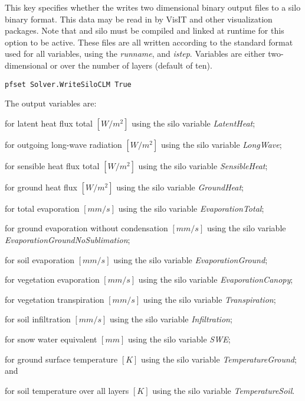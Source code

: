 {This key specifies whether the  writes two dimensional binary output files to a silo binary format. This data may be read in by VisIT and other visualization packages.  Note that  and silo must be compiled and linked at runtime for this option to be active. These files are all written according to the standard format used for all \parflow{} variables, using the {\em runname}, and {\em istep}.  Variables are either two-dimensional or over the number of  layers (default of ten).
}
\begin{display}\begin{verbatim}
pfset Solver.WriteSiloCLM True
\end{verbatim}\end{display}
The output variables are:
\begin{description}
\item {} for latent heat flux total $[W/m^2]$ using the silo variable {\em LatentHeat};
\item {} for outgoing long-wave radiation $[W/m^2]$ using the silo variable {\em LongWave};
\item {} for sensible heat flux total $[W/m^2]$ using the silo variable {\em SensibleHeat};
\item {} for ground heat flux $[W/m^2]$ using the silo variable {\em GroundHeat};
\item {} for total evaporation $[mm/s]$ using the silo variable {\em EvaporationTotal};
\item {} for ground evaporation without condensation $[mm/s]$ using the silo variable {\em EvaporationGroundNoSublimation};
\item {} for soil evaporation $[mm/s]$ using the silo variable {\em EvaporationGround};
\item {} for vegetation evaporation $[mm/s]$ using the silo variable {\em EvaporationCanopy};
\item {} for vegetation transpiration $[mm/s]$ using the silo variable {\em Transpiration};
\item {} for soil infiltration $[mm/s]$ using the silo variable {\em Infiltration};
\item {} for snow water equivalent $[mm]$ using the silo variable {\em SWE};
\item {} for ground surface temperature $[K]$ using the silo variable {\em TemperatureGround}; and
\item {} for soil temperature over all layers $[K]$ using the silo variable {\em TemperatureSoil}.
\end{description}

